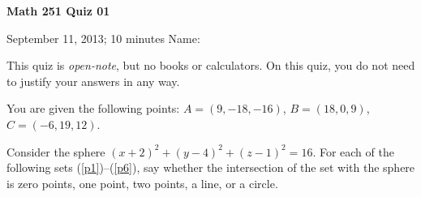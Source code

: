 \documentclass[12pt]{exam}
\begin{document}
\noindent
\textbf{{\large Math 251 \hfill Quiz 01}}

\noindent
September 11, 2013; 10 minutes \hfill Name: \underline{\hspace{3in}} 

\noindent

\noindent
This quiz is \emph{open-note}, but no books or calculators. On this
quiz, you do not need to justify your answers in any way.

\begin{questions} 

\question[3] You are given the following points: $A = (9, -18, -16)$, $B = (18, 0, 9)$, $C = (-6, 19, 12)$.



\question Consider the sphere $(x + 2)^2 + (y - 4)^2 + (z - 1)^2 = 16$. For each of the following sets (\ref{p1})--(\ref{p6}), say whether the intersection of the set with the sphere is zero points, one point, two points, a line, or a circle.

\end{questions}
\end{document}
